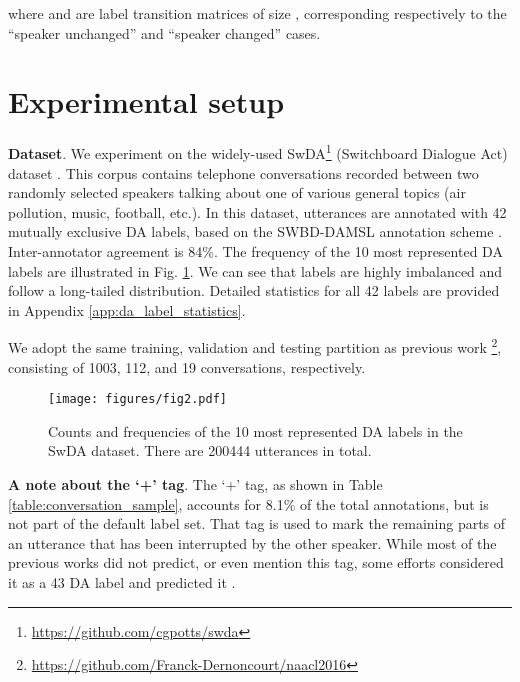 \documentclass[11pt,a4paper]{article}
\begin{document}
{\small
\setlength{\abovedisplayskip}{-3pt}
\setlength{\belowdisplayskip}{3pt}

}

\noindent where  and  are label transition matrices of size , corresponding respectively to the ``speaker unchanged'' and ``speaker changed'' cases.

\section{Experimental setup}

\noindent \textbf{Dataset}.
We experiment on the widely-used SwDA\footnote{\url{https://github.com/cgpotts/swda}} (Switchboard Dialogue Act) dataset \citep{jurafsky1997switchboard,stolcke-etal-2000-dialogue}.
This corpus contains telephone conversations recorded between two randomly selected speakers talking about one of various general topics (air pollution, music, football, etc.).
In this dataset, utterances are annotated with 42 mutually exclusive DA labels, based on the SWBD-DAMSL annotation scheme \citep{jurafsky1997switchboard}.
Inter-annotator agreement is 84\%.
The frequency of the 10 most represented DA labels are illustrated in Fig. \ref{fig:barplot}. 
We can see that labels are highly imbalanced and follow a long-tailed distribution.
Detailed statistics for all 42 labels are provided in Appendix \ref{app:da_label_statistics}.

We adopt the same training, validation and testing partition as previous work \citep{lee2016sequential}\footnote{\url{https://github.com/Franck-Dernoncourt/naacl2016}}, consisting of 1003, 112, and 19 conversations, respectively.

\begin{figure}[t]
\centering
\texttt{[image: figures/fig2.pdf]}
\caption{Counts and frequencies of the 10 most represented DA labels in the SwDA dataset.
There are 200444 utterances in total.}
\label{fig:barplot}
\end{figure}


\noindent \textbf{A note about the `+' tag}.
The `+' tag, as shown in Table \ref{table:conversation_sample}, accounts for 8.1\% of the total annotations, but is not part of the default label set.
That tag is used to mark the remaining parts of an utterance that has been interrupted by the other speaker.
While most of the previous works did not predict, or even mention this tag, some efforts considered it as a 43 DA label and predicted it \citep{lee2016sequential,raheja-tetreault-2019-dialogue}.
\end{document}
